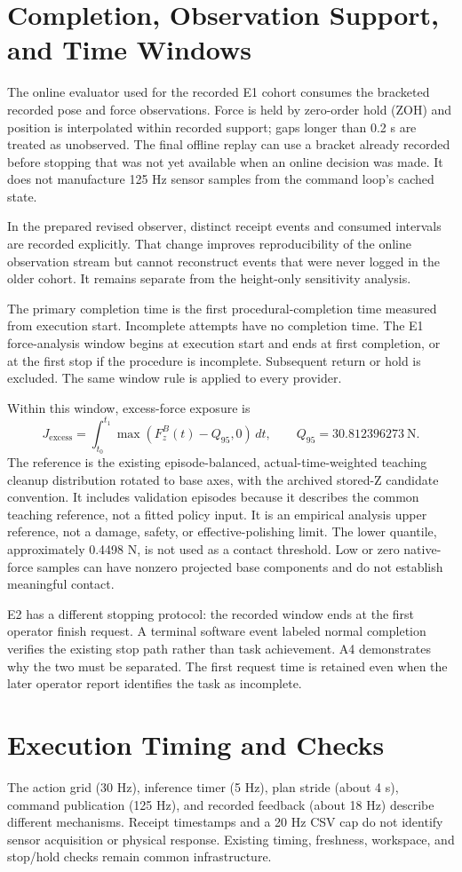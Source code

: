 \section{Completion, Observation Support, and Time Windows}
The online evaluator used for the recorded E1 cohort consumes the bracketed recorded pose and force observations. Force is held by zero-order hold (ZOH) and position is interpolated within recorded support; gaps longer than 0.2 s are treated as unobserved. The final offline replay can use a bracket already recorded before stopping that was not yet available when an online decision was made. It does not manufacture 125 Hz sensor samples from the command loop's cached state.

In the prepared revised observer, distinct receipt events and consumed intervals are recorded explicitly. That change improves reproducibility of the online observation stream but cannot reconstruct events that were never logged in the older cohort. It remains separate from the height-only sensitivity analysis.

The primary completion time is the first procedural-completion time measured from execution start. Incomplete attempts have no completion time. The E1 force-analysis window begins at execution start and ends at first completion, or at the first stop if the procedure is incomplete. Subsequent return or hold is excluded. The same window rule is applied to every provider.

Within this window, excess-force exposure is
\begin{equation}
 J_{\mathrm{excess}}=\int_{t_0}^{t_1}
 \max\!\left(F_z^B(t)-Q_{95},0\right)\,dt,
 \qquad Q_{95}=30.812396273\ \mathrm{N}.
 \label{eq:excess_force}
\end{equation}
The reference is the existing episode-balanced, actual-time-weighted teaching cleanup distribution rotated to base axes, with the archived stored-Z candidate convention. It includes validation episodes because it describes the common teaching reference, not a fitted policy input. It is an empirical analysis upper reference, not a damage, safety, or effective-polishing limit. The lower quantile, approximately 0.4498 N, is not used as a contact threshold. Low or zero native-force samples can have nonzero projected base components and do not establish meaningful contact.

E2 has a different stopping protocol: the recorded window ends at the first operator finish request. A terminal software event labeled normal completion verifies the existing stop path rather than task achievement. A4 demonstrates why the two must be separated. The first request time is retained even when the later operator report identifies the task as incomplete.

\section{Execution Timing and Checks}
The action grid (30 Hz), inference timer (5 Hz), plan stride (about 4 s), command publication (125 Hz), and recorded feedback (about 18 Hz) describe different mechanisms. Receipt timestamps and a 20 Hz CSV cap do not identify sensor acquisition or physical response. Existing timing, freshness, workspace, and stop/hold checks remain common infrastructure.

